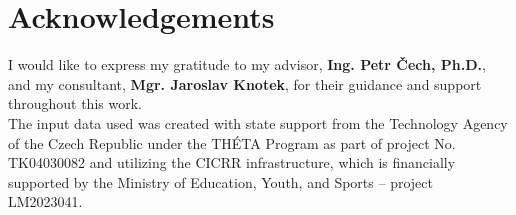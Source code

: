 \chapter*{Acknowledgements}

    
I would like to express my gratitude to my advisor, \textbf{Ing. Petr Čech, Ph.D.}, and my consultant, \textbf{Mgr. Jaroslav Knotek}, for their guidance and support throughout this work.
\\
The input data used was created with state support from the Technology Agency of the Czech Republic under the THÉTA Program as part of project No. TK04030082 and utilizing the CICRR infrastructure, which is financially supported by the Ministry of Education, Youth, and Sports – project LM2023041.

\newpage